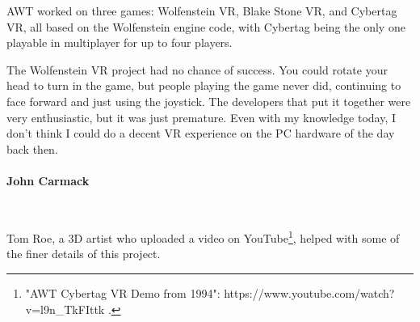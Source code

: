  AWT worked on three games: Wolfenstein VR, Blake Stone VR, and Cybertag VR, all based on the Wolfenstein engine code, with Cybertag being the only one playable in multiplayer for up to four players. \\
\par
\begin{fancyquotes}
The Wolfenstein VR project had no chance of success.  You could rotate your head to turn in the game, but people playing the game never did, continuing to face forward and just using the joystick.  The developers that put it together were very enthusiastic, but it was just premature.  Even with my knowledge today, I don't think I could do a decent VR experience on the PC hardware of the day back then.\\
\bigskip \\
\textbf{John Carmack}
 \end{fancyquotes}\\
\par
Tom Roe, a 3D artist who uploaded a video on YouTube\footnote{"AWT Cybertag VR Demo from 1994": https://www.youtube.com/watch?v=l9n\_TkFIttk .}, helped with some of the finer details of this project.
\par


\begin{figure}[H]
  \centering
 
\end{figure}

\begin{figure}[H]
  \centering
{}
 
\end{figure}

\begin{figure}[H]
  \centering
{}
 
\end{figure}


